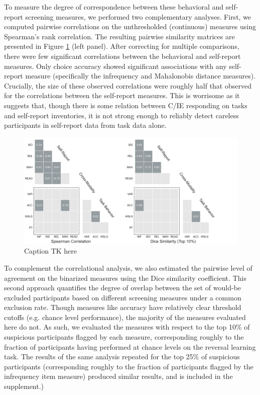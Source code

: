 \documentclass[a4paper,notitlepage,12pt]{article}
\begin{document}
To measure the degree of correspondence between these behavioral and self-report screening measures, we performed two complementary analyses. First, we computed pairwise correlations on the unthresholded (continuous) measures using Spearman's rank correlation. The resulting pairwise similarity matrices are presented in Figure \ref{fig:correspondence} (left panel). After correcting for multiple comparisons, there were few significant correlations between the behavioral and self-report measures. Only choice accuracy showed significant associations with any self-report measure (specifically the infrequency and Mahalonobis distance measures). Crucially, the size of these observed correlations were roughly half that observed for the correlations between the self-report measures. This is worrisome as it suggests that, though there is some relation between C/IE responding on tasks and self-report inventories, it is not strong enough to reliably detect careless participants in self-report data from task data alone.

\begin{figure}[!t]
\includegraphics[width=16cm, trim=0 0 3cm 0]{../figures/main_02b.png}
\centering
\caption{Caption TK here}
\label{fig:correspondence}
\end{figure}

To complement the correlational analysis, we also estimated the pairwise level of agreement on the binarized measures using the Dice similarity coefficient. This second approach quantifies the degree of overlap between the set of would-be excluded participants based on different screening measures under a common exclusion rate. Though measures like accuracy have relatively clear threshold cutoffs (e.g. chance level performance), the majority of the measures evaluated here do not. As such, we evaluated the measures with respect to the top 10\% of suspicious participants flagged by each measure, corresponding roughly to the fraction of participants having performed at chance levels on the reversal learning task. The results of the same analysis repeated for the top 25\% of suspicious participants (corresponding roughly to the fraction of participants flagged by the infrequency item measure) produced similar results, and is included in the supplement.)
\end{document}
